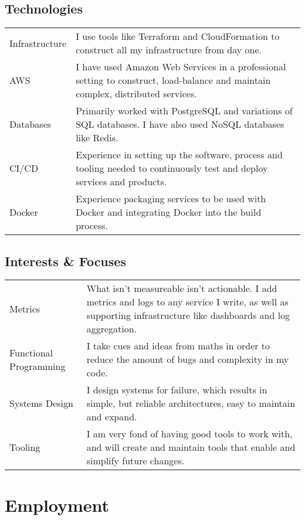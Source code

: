 \documentclass[a4paper]{article}
\begin{document}
\subsection*{Technologies}
\begin{tabular}{ p{2.75cm} | p{14cm} }
Infrastructure & I use tools like Terraform and CloudFormation to
construct all my infrastructure from day one. \\
AWS & I have used Amazon Web Services in a professional setting to construct, load-balance and
maintain complex, distributed services. \\
Databases & Primarily worked with PostgreSQL and variations of SQL
databases. I have also used NoSQL databases like Redis. \\
CI/CD & Experience in setting up the software, process and tooling needed
to continuously test and deploy services and products.\\
Docker & Experience packaging services to be used with Docker and
integrating Docker into the build process.
\end{tabular}

\subsection*{Interests \& Focuses}
\begin{tabular}{ p{2.75cm} | p{14cm} }
  Metrics & What isn't measureable isn't actionable. I add metrics and logs to
any service I write, as well as supporting infrastructure like dashboards and
log aggregation. \\
Functional \linebreak Programming & I take cues and ideas from maths in order to reduce the
amount of bugs and complexity in my code.\\
Systems Design & I design systems for failure, which results in simple,
but reliable architectures, easy to maintain and expand.\\
Tooling & I am very fond of having good tools to work with, and will create and
maintain tools that enable and simplify future changes. \\
\end{tabular}

\section*{Employment}
\end{document}
